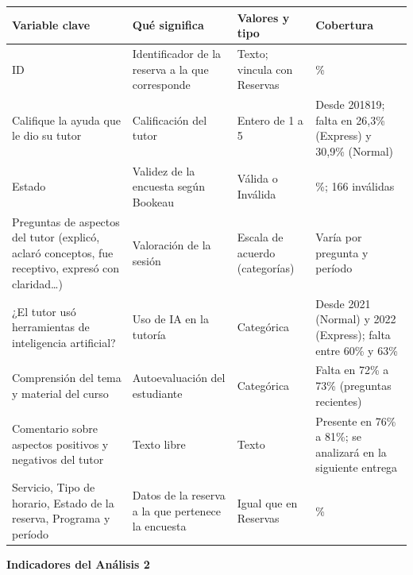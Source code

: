 \documentclass[11pt,letterpaper]{article}
\begin{document}
\begingroup\small\setlength{\tabcolsep}{4pt}\renewcommand{\arraystretch}{1.15}
\begin{longtable}{>{\raggedright\arraybackslash}p{}>{\raggedright\arraybackslash}p{}>{\raggedright\arraybackslash}p{}>{\raggedright\arraybackslash}p{}}
\toprule
\textbf{Variable clave} & \textbf{Qué significa} & \textbf{Valores y tipo} & \textbf{Cobertura} \\
\midrule
\endhead
ID & Identificador de la reserva a la que corresponde & Texto; vincula con Reservas & 100\% \\
Califique la ayuda que le dio su tutor & Calificación del tutor & Entero de 1 a 5 & Desde 201819; falta en 26,3\% (Express) y 30,9\% (Normal) \\
Estado & Validez de la encuesta según Bookeau & Válida o Inválida & 100\%; 166 inválidas \\
Preguntas de aspectos del tutor (explicó, aclaró conceptos, fue receptivo, expresó con claridad\ldots{}) & Valoración de la sesión & Escala de acuerdo (categorías) & Varía por pregunta y período \\
¿El tutor usó herramientas de inteligencia artificial? & Uso de IA en la tutoría & Categórica & Desde 2021 (Normal) y 2022 (Express); falta entre 60\% y 63\% \\
Comprensión del tema y material del curso & Autoevaluación del estudiante & Categórica & Falta en 72\% a 73\% (preguntas recientes) \\
Comentario sobre aspectos positivos y negativos del tutor & Texto libre & Texto & Presente en 76\% a 81\%; se analizará en la siguiente entrega \\
Servicio, Tipo de horario, Estado de la reserva, Programa y período & Datos de la reserva a la que pertenece la encuesta & Igual que en Reservas & 100\% \\
\bottomrule
\end{longtable}
\endgroup


\textbf{Indicadores del Análisis 2}
\end{document}
